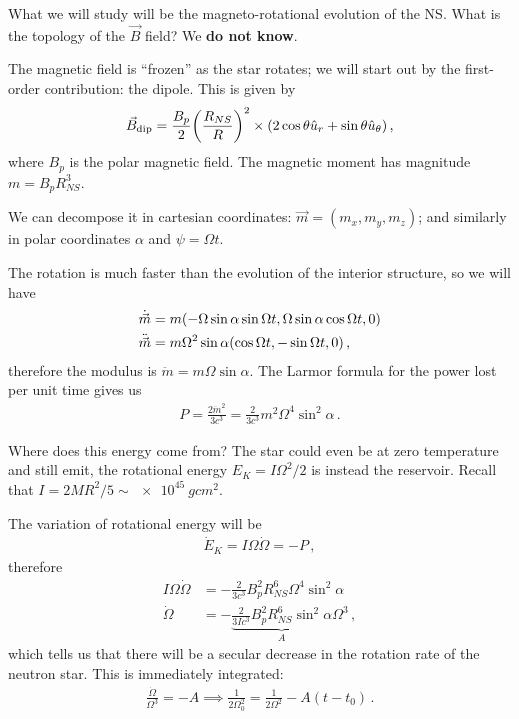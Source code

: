 \documentclass[main.tex]{subfiles}
\begin{document}
What we will study will be the magneto-rotational evolution of the NS. 
What is the topology of the \(\vec{B}\) field? We \textbf{do not know}. 

The magnetic field is ``frozen'' as the star rotates; we will start out by the first-order contribution: the dipole. 
This is given by 
%
\begin{align}
\vec{B} _{\text{dip}} = \frac{B_p}{2} \qty( \frac{R_{NS}}{R})^2
\times \qty(2 \cos \theta \hat{u}_r + \sin \theta \hat{u}_\theta )
\,,
\end{align}
%
where \(B_p\) is the polar magnetic field. 
The magnetic moment has magnitude \(m = B_p R_{NS}^3\). 

We can decompose it in cartesian coordinates: \(\vec{m} = (m_x, m_y, m_z)\); and similarly in polar coordinates \(\alpha \) and \(\psi = \Omega t\). 

The rotation is much faster than the evolution of the interior structure, so we will have 
%
\begin{align}
\dot{\vec{m}} &= m \qty(- \Omega \sin \alpha \sin \Omega t, \Omega \sin \alpha \cos \Omega t , 0)  \\
\ddot{\vec{m}} &= m \Omega^2 \sin \alpha \qty(\cos \Omega t, - \sin \Omega t, 0) 
\,,
\end{align}
%
therefore the modulus is \(\ddot{m} = m \Omega \sin \alpha \). 
The Larmor formula for the power lost per unit time gives us 
%
\begin{align}
P = \frac{2 \ddot{m}^2}{3 c^3} = \frac{2}{3 c^3} m^2 \Omega^{4} \sin^2 \alpha 
\,.
\end{align}

Where does this energy come from? The star could even be at zero temperature and still emit, the rotational energy \(E_K = I \Omega^2 /2\) is instead the reservoir. 
Recall that \(I = 2 M R^2 /5 \sim \SI{e45}{g cm^2}\). 

The variation of rotational energy will be 
%
\begin{align}
\dot{E}_K = I \Omega \dot{\Omega} = - P 
\,,
\end{align}
%
therefore 
%
\begin{align}
I \Omega \dot{\Omega} &= - \frac{2}{3c^3} B_p^2R_{NS}^{6} \Omega^{4} \sin^2\alpha   \\
\dot{\Omega} &= - \underbrace{\frac{2}{3 I c^3} B_p^2R_{NS}^{6} \sin^2\alpha}_{A} \Omega^{3} 
\,,
\end{align}
%
which tells us that there will be a secular decrease in the rotation rate of the neutron star. This is immediately integrated: 
%
\begin{align}
\frac{\dot{\Omega}}{\Omega^3} = - A \implies
\frac{1}{2 \Omega_0^2} = \frac{1}{2 \Omega^2} - A(t - t_0 ) 
\,.
\end{align}
\end{document}
